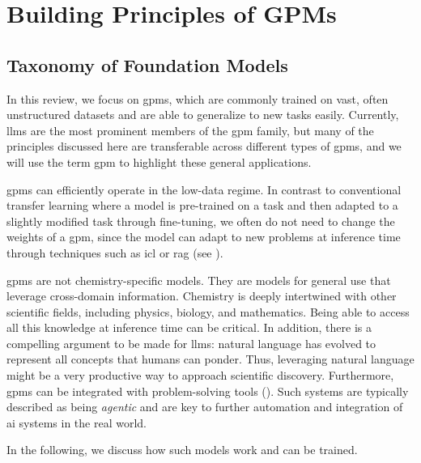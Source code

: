 \section{Building Principles of GPMs}

\subsection{Taxonomy of Foundation Models}
\label{sec:taxonomy}

In this review, we focus on \glspl{gpm}, which are commonly trained on vast, often unstructured datasets and are able to generalize to new tasks easily.
Currently, \glspl{llm} are the most prominent members of the \gls{gpm} family, but many of the principles discussed here are transferable across different types of \glspl{gpm}, and we will use the term \gls{gpm} to highlight these general applications.

\Glspl{gpm} can efficiently operate in the low-data regime. 
In contrast to conventional transfer learning where a model is pre-trained on a task and then adapted to a slightly modified task through fine-tuning, we often do not need to change the weights of a \gls{gpm}, since the model can adapt to new problems at inference time through techniques such as \gls{icl}\autocite{brown2020language} or \gls{rag} (see ).\autocite{lewis2020retrieval}

\glspl{gpm} are not chemistry-specific models. 
They are models for general use that leverage cross-domain information.
Chemistry is deeply intertwined with other scientific fields, including physics, biology, and mathematics. 
Being able to access all this knowledge at inference time can be critical.
In addition, there is a compelling argument to be made for \glspl{llm}:  natural language has evolved to represent all concepts that humans can ponder. Thus, leveraging natural language might be a very productive way to approach scientific discovery.  
Furthermore, \glspl{gpm} can be integrated with problem-solving tools (). 
Such systems are typically described as being \emph{agentic} and are key to further automation and integration of \gls{ai} systems in the real world. 

In the following, we discuss how such models work and can be trained.

